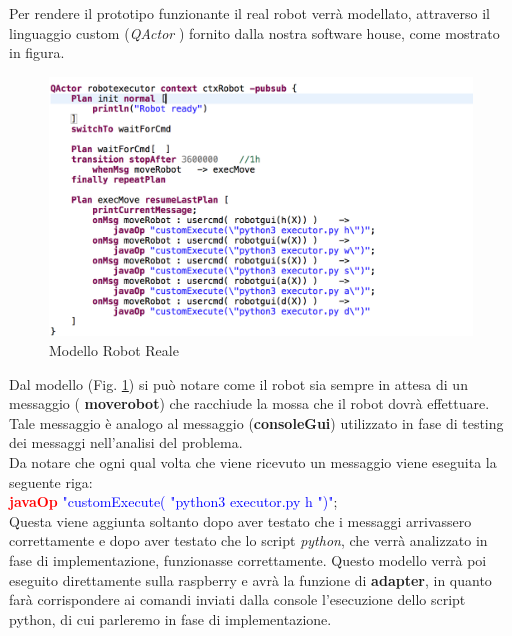\documentclass{llncs}
\newcommand{\qa}{\textsf{\textit{QActor }}}
\begin{document}
Per rendere il prototipo funzionante il real robot verr\`a modellato, attraverso il linguaggio custom (\qa) fornito dalla nostra software house, come mostrato in figura.\\
\begin{figure}
    \centering
    \includegraphics[width=1\textwidth]{Immagini/robotexecutor(req1).png}
    \caption{Modello Robot Reale}
    \label{fig:RRmodel}
\end{figure}
\pagebreak
Dal modello (Fig. \hyperref[fig:RRmodel]{\ref{fig:RRmodel}}) si pu\`o notare come il robot sia sempre in attesa di un messaggio ( \textbf{moverobot}) che racchiude la mossa che il robot dovr\`a effettuare. Tale messaggio \`e analogo al messaggio (\textbf{consoleGui}) utilizzato in fase di testing dei messaggi nell'analisi del problema.\\
Da notare che ogni qual volta che viene ricevuto un messaggio viene eseguita la seguente riga:\\
\textcolor{red}{\textbf{javaOp}} \textcolor{blue}{"customExecute( "python3 executor.py h ")"};\\
Questa viene aggiunta soltanto dopo aver testato che i messaggi arrivassero correttamente e dopo aver testato che lo script \textit{python}, che verr\`a analizzato in fase di implementazione, funzionasse correttamente.
Questo modello verr\`a poi eseguito direttamente sulla raspberry e avr\`a la funzione di \textbf{adapter}, in quanto far\`a corrispondere ai comandi inviati dalla console l'esecuzione dello script python, di cui parleremo in fase di implementazione.


\end{document}
